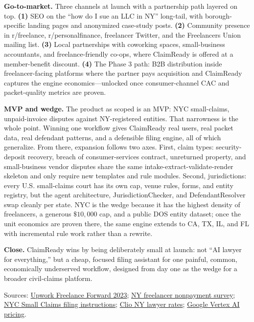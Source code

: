 \documentclass[11pt]{article}
\begin{document}
{\bfseries Go-to-market.} Three channels at launch with a partnership path layered on top. \textbf{(1)} SEO on the ``how do I sue an LLC in NY'' long-tail, with borough-specific landing pages and anonymized case-study posts. \textbf{(2)} Community presence in r/freelance, r/personalfinance, freelancer Twitter, and the Freelancers Union mailing list. \textbf{(3)} Local partnerships with coworking spaces, small-business accountants, and freelance-friendly co-ops, where ClaimReady is offered at a member-benefit discount. \textbf{(4)} The Phase 3 path: B2B distribution inside freelancer-facing platforms where the partner pays acquisition and ClaimReady captures the engine economics---unlocked once consumer-channel CAC and packet-quality metrics are proven.

{\bfseries MVP and wedge.} The product as scoped is an MVP: NYC small-claims, unpaid-invoice disputes against NY-registered entities. That narrowness is the whole point. Winning one workflow gives ClaimReady real users, real packet data, real defendant patterns, and a defensible filing engine, all of which generalize. From there, expansion follows two axes. First, claim types: security-deposit recovery, breach of consumer-services contract, unreturned property, and small-business vendor disputes share the same intake-extract-validate-render skeleton and only require new templates and rule modules. Second, jurisdictions: every U.S. small-claims court has its own cap, venue rules, forms, and entity registry, but the agent architecture, JurisdictionChecker, and DefendantResolver swap cleanly per state. NYC is the wedge because it has the highest density of freelancers, a generous \(\$10{,}000\) cap, and a public DOS entity dataset; once the unit economics are proven there, the same engine extends to CA, TX, IL, and FL with incremental rule work rather than a rewrite.
\vspace{-1pt}

{\bfseries Close.} ClaimReady wins by being deliberately small at launch: not ``AI lawyer for everything,'' but a cheap, focused filing assistant for one painful, common, economically underserved workflow, designed from day one as the wedge for a broader civil-claims platform.

\vspace{1pt}
{\scriptsize
Sources: \href{https://www.upwork.com/press/releases/upwork-study-finds-64-million-americans-freelanced-in-2023-adding-1-27-trillion-to-u-s-economy}{Upwork Freelance Forward 2023};
\href{https://nwu.org/survey-shows-that-62-of-ny-freelancers-experience-non-payment-need-freelance-isnt-free-law-statewide/}{NY freelancer nonpayment survey};
\href{https://nycourts.gov/courts/nyc/smallclaims/forms/instructionsforfiling.pdf}{NYC Small Claims filing instructions};
\href{https://www.clio.com/resources/legal-trends/compare-lawyer-rates/ny/}{Clio NY lawyer rates};
\href{https://cloud.google.com/vertex-ai/generative-ai/pricing}{Google Vertex AI pricing}.}
\end{document}
